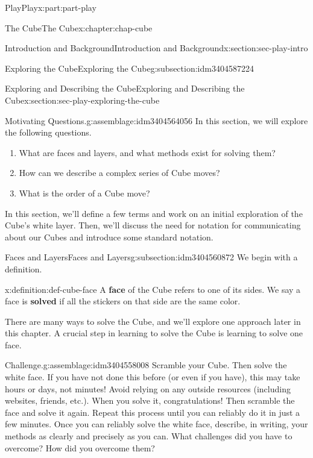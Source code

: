 \documentclass[oneside,10pt,]{book}
\newcommand{\terminology}[1]{\textbf{#1}}
\numberwithin{equation}{section}
\begin{document}
\begin{partptx}{Play}{}{Play}{}{}{x:part:part-play}
\begin{chapterptx}{The Cube}{}{The Cube}{}{}{x:chapter:chap-cube}
\begin{sectionptx}{Introduction and Background}{}{Introduction and Background}{}{}{x:section:sec-play-intro}
\begin{subsectionptx}{Exploring the Cube}{}{Exploring the Cube}{}{}{g:subsection:idm3404587224}
\end{subsectionptx}
\end{sectionptx}
%
%
\typeout{************************************************}
\typeout{************************************************}
%
\begin{sectionptx}{Exploring and Describing the Cube}{}{Exploring and Describing the Cube}{}{}{x:section:sec-play-exploring-the-cube}
\begin{assemblage}{Motivating Questions.}{g:assemblage:idm3404564056}%
In this section, we will explore the following questions. %
\begin{enumerate}
\item{}What are faces and layers, and what methods exist for solving them?%
\item{}How can we describe a complex series of Cube moves?%
\item{}What is the order of a Cube move?%
\end{enumerate}
%
\end{assemblage}
\begin{introduction}{}%
In this section, we'll define a few terms and work on an initial exploration of the Cube's white layer. Then, we'll discuss the need for notation for communicating about our Cubes and introduce some standard notation.%
\end{introduction}%
%
%
\typeout{************************************************}
\typeout{************************************************}
%
\begin{subsectionptx}{Faces and Layers}{}{Faces and Layers}{}{}{g:subsection:idm3404560872}
We begin with a definition.%
\begin{definition}{}{x:definition:def-cube-face}%
%
A \terminology{face} of the Cube refers to one of its sides. We say a face is \terminology{solved} if all the stickers on that side are the same color.%
\end{definition}
There are many ways to solve the Cube, and we'll explore one approach later in this chapter. A crucial step in learning to solve the Cube is learning to solve one face.%
\begin{assemblage}{Challenge.}{g:assemblage:idm3404558008}%
Scramble your Cube. Then solve the white face. If you have not done this before (or even if you have), this may take hours or days, not minutes! Avoid relying on any outside resources (including websites, friends, etc.). When you solve it, congratulations! Then scramble the face and solve it again. Repeat this process until you can reliably do it in just a few minutes. Once you can reliably solve the white face, describe, in writing, your methods as clearly and precisely as you can. What challenges did you have to overcome? How did you overcome them?%

\end{assemblage}
\end{subsectionptx}
\end{sectionptx}
\end{chapterptx}
\end{partptx}
\end{document}
